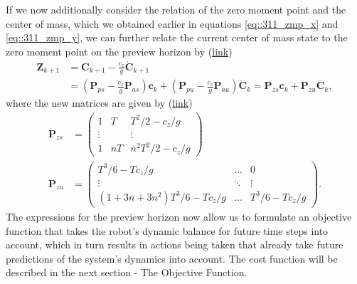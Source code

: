 If we now additionally consider the relation of the zero moment point and the center of mass, which we obtained earlier in equations \ref{eq::311_zmp_x} and \ref{eq::311_zmp_y}, we can further relate the current center of mass state to the zero moment point on the preview horizon by (\href{https://github.com/mhubii/nmpc_pattern_generator/blob/5a213044c927dc6aac9f7e32ce1e5fb472cd67bb/libs/pattern_generator/include/pattern_generator/base_generator.h#L219}{link})
\begin{align}
	\bm{Z}_{k+1} &= \bm{C}_{k+1} - \frac{c_z}{g}\ddot{\bm{C}}_{k+1} \\
	&= \left(\bm{P}_{ps}-\frac{c_z}{g}\bm{P}_{as}\right)\bm{c}_k + \left(\bm{P}_{pu}-\frac{c_z}{g}\bm{P}_{au}\right)\ddddot{\bm{C}}_k = \bm{P}_{zs} \bm{c}_k + \bm{P}_{zu}\dddot{\bm{C}}_k,
\end{align}
where the new matrices are given by (\href{https://github.com/mhubii/nmpc_pattern_generator/blob/5a213044c927dc6aac9f7e32ce1e5fb472cd67bb/libs/pattern_generator/src/base_generator.cpp#L420}{link})
\begin{align}
	\bm{P}_{zs} &= \begin{pmatrix}
	1 & T & T^2/2 - c_z/g \\
	\vdots & & \vdots \\
	1 & nT & n^2T^2/2 - c_z/g
	\end{pmatrix} \\ 
	\bm{P}_{zu} &= \begin{pmatrix}
	T^3/6 - Tc_z/g & \dots & 0 \\
	\vdots & \ddots & \vdots \\
	(1+3n+3n^2)T^3/6 - Tc_z/g & \dots & T^3/6-Tc_z/g
	\end{pmatrix}.
\end{align}
The expressions for the preview horizon now allow us to formulate an objective function that takes the robot's dynamic balance for future time steps into account, which in turn results in actions being taken that already take future predictions of the system's dynamics into account. The cost function will be described in the next section - The Objective Function.

